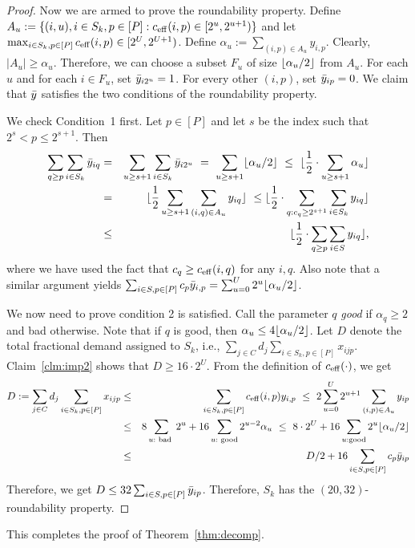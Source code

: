 \begin{proof}
\noindent
Now we are armed to prove the roundability property. Define $A_u := \{(i,u), i\in S_k,p\in [P]: c_{\mathrm{eff}}(i,p) \in [2^u,2^{u+1})\}$ and let $\max_{i\in S_k,p\in [P]} c_{\mathrm{eff}}(i,p) \in [2^U,2^{U+1})$.
Define $\alpha_u := \sum_{(i,p) \in A_u} y_{i,p}$. Clearly, $|A_u| \geq \alpha_u$. Therefore, we can choose a subset $F_u$ of size $\lfloor\alpha_u/2\rfloor$
from $A_u$.
For each $u$ and for each $i\in F_u$, set $\bar{y}_{i2^u} = 1$. For every other $(i,p)$, set $\bar{y}_{ip} = 0$. We claim that $\bar{y}$
satisfies the two conditions of the roundability property.

We check Condition~1 first. Let $p \in [P]$ and let $s$ be the index such that $2^s < p \leq 2^{s+1}$. Then
\begin{eqnarray*}
\sum_{q \geq p} \sum_{i \in S_k} \bar{y}_{iq} & = & \sum_{u \geq s+1} \sum_{i \in S_k} \bar{y}_{i2^u} \ = \ \sum_{u \geq s+1} \lfloor\alpha_u/2 \rfloor
\ \leq \ \lfloor\frac12 \cdot \sum_{u \geq s+1} \alpha_u \rfloor \\
& = &  \lfloor\frac12 \sum_{u \geq s+1} \sum_{(i,q) \in A_u} y_{iq}\rfloor \ \leq \lfloor\frac12 \cdot \sum_{q: c_q \geq 2^{s+1}} \sum_{i \in S_k} y_{iq} \rfloor \\
& \leq &  \lfloor \frac12 \cdot \sum_{q \geq p}\sum_{i\in S} y_{iq}\rfloor,
\end{eqnarray*}
 where we have used the fact that $c_q \geq c_{\mathrm{eff}}(i,q)$ for any $i,q$.
Also note that a similar argument yields $\sum_{i\in S,p\in [P]} c_p \bar{y}_{i,p} = \sum_{u=0}^U 2^{u} \lfloor\alpha_u/2\rfloor$.

We now need to prove condition 2 is satisfied. \smallskip
Call the parameter $q$ {\em good} if $\alpha_q \geq 2$ and bad otherwise. 
Note that if $q$ is good, then $\alpha_u \leq 4 \lfloor\alpha_u/2\rfloor$. 
Let $D$ denote the total fractional demand assigned to $S_k$, i.e.,
$\sum_{j\in C} d_j \sum_{i\in S_k,p\in [P]} x_{ijp}$. Claim~\ref{clm:imp2} shows that $D \geq 16 \cdot 2^U$.
From the definition of $c_{\mathrm{eff}}(\cdot)$, we get
\begin{eqnarray*}
D := \sum_{j\in C} d_j \sum_{i\in S_k,p\in [P]} x_{ijp} & \leq &  \sum_{i\in S_k,p\in [P]} c_{\mathrm{eff}}(i,p)y_{i,p}	\  \leq \ 2 \sum_{u=0}^U 2^{u+1} \sum_{(i,p)\in A_u} y_{ip} \\
	& \leq & 8 \sum_{u: \textrm{ bad }} 2^u + 16 \sum_{u: \textrm{ good}} 2^{u-2} \alpha_u
		\  \leq \  8\cdot 2^U + 16 \sum_{u: \textrm{good}}2^{u} \lfloor\alpha_u/2\rfloor  \\
																				& \leq & D/2 + 16 \sum_{i\in S,p\in [P]}c_p\bar{y}_{ip}
\end{eqnarray*}
Therefore, we get $D \leq 32\sum_{i\in S,p\in [P]} \bar{y}_{ip}$. Therefore, $S_k$ has the $(20,32)$-roundability property.
\end{proof}
\noindent
This completes the proof of Theorem~\ref{thm:decomp}. 


